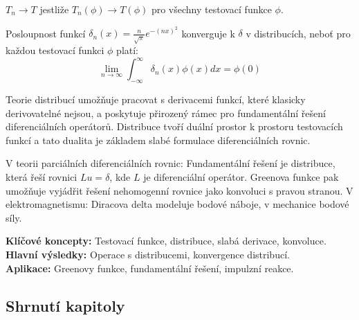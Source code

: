\begin{definition}
$T_n \to T$ jestliže $T_n(\phi) \to T(\phi)$ pro všechny testovací funkce $\phi$.
\end{definition}

\begin{example}
Posloupnost funkcí $\delta_n(x) = \frac{n}{\sqrt{\pi}} e^{-(nx)^2}$ konverguje k $\delta$ v distribucích, neboť pro každou testovací funkci $\phi$ platí:
\[
\lim_{n\to\infty} \int_{-\infty}^\infty \delta_n(x)\phi(x)dx = \phi(0)
\]
\end{example}

\begin{keyinsight}
Teorie distribucí umožňuje pracovat s derivacemi funkcí, které klasicky derivovatelné nejsou, a poskytuje přirozený rámec pro fundamentální řešení diferenciálních operátorů. Distribuce tvoří duální prostor k prostoru testovacích funkcí a tato dualita je základem slabé formulace diferenciálních rovnic.
\end{keyinsight}

\begin{application}
V teorii parciálních diferenciálních rovnic: Fundamentální řešení je distribuce, která řeší rovnici $Lu = \delta$, kde $L$ je diferenciální operátor. Greenova funkce pak umožňuje vyjádřit řešení nehomogenní rovnice jako konvoluci s pravou stranou. V elektromagnetismu: Diracova delta modeluje bodové náboje, v mechanice bodové síly.
\end{application}

\begin{summary}
\textbf{Klíčové koncepty:} Testovací funkce, distribuce, slabá derivace, konvoluce. \\
\textbf{Hlavní výsledky:} Operace s distribucemi, konvergence distribucí. \\
\textbf{Aplikace:} Greenovy funkce, fundamentální řešení, impulzní reakce.
\end{summary}

\spc

\subsection*{Shrnutí kapitoly}

